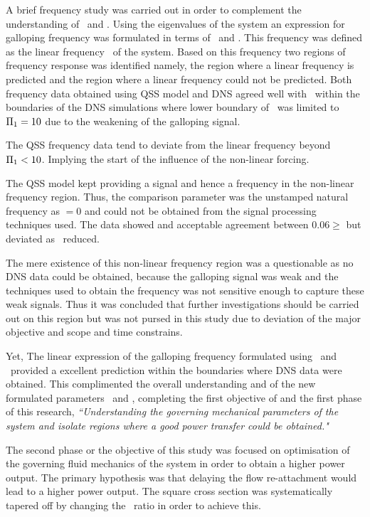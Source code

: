  A brief frequency study was carried out in order to complement the understanding of \massstiff\ and \massdamp. Using the eigenvalues of the system an expression for galloping frequency was formulated in terms of \massstiff\ and \massdamp. This frequency was defined as the linear frequency \freqlin\ of the system. Based on this frequency two regions of frequency response was identified namely, the region where a linear frequency is predicted and the region where a linear frequency could not be predicted. Both frequency data obtained using QSS model and DNS agreed well with \freqlin\ within the boundaries of the DNS simulations where lower boundary of \massstiff\ was limited to $\Pi_1=10$ due to the weakening of the galloping signal.
 
 The QSS frequency data tend to deviate from the linear frequency beyond $\Pi_1<10$. Implying the start of the influence of the non-linear forcing. 
 
 The QSS model kept providing a signal and hence a frequency in the non-linear frequency region. Thus, the comparison parameter was the unstamped natural frequency as \freqlin$=0$ and \freqdns could not be obtained from the signal processing techniques used. The data showed and acceptable agreement between $0.06\geq$ but deviated as \massstiff\ reduced.
 
 The mere existence of this non-linear frequency region was a questionable as no DNS data could be obtained, because the galloping signal was weak and the techniques used to obtain the  frequency was not sensitive enough to capture these weak signals. Thus it was concluded that further investigations should be carried out on this region but was not pursed in this study due to deviation of the major objective and scope and time constrains.
 
 Yet, The linear expression of the galloping frequency formulated using \massstiff\ and \massdamp\ provided a excellent prediction within the boundaries where DNS data were obtained. This complimented the overall understanding and of the new formulated parameters \massstiff\ and \massdamp, completing the first objective of and the first phase of this research, \emph{``Understanding the governing mechanical parameters of the system and isolate regions where a good power transfer could be obtained."}
 
 The second phase or the objective of this study was focused on optimisation of the governing fluid mechanics of the system in order to obtain a higher power output. The primary hypothesis was that delaying the flow re-attachment would lead to a higher power output. The square cross section was systematically tapered off by changing the \ratio\ ratio in order to achieve this.
 
